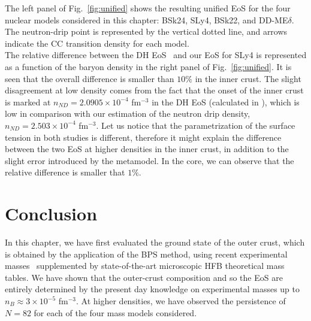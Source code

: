 The left panel of Fig.~\ref{fig:unified} shows the resulting unified EoS for
the four nuclear models considered in this chapter: BSk24, SLy4, BSk22, 
and DD-ME$\delta$. The neutron-drip point is represented by the vertical dotted
line, and arrows indicate the CC transition density for each model.\\
The relative difference between the DH EoS~\cite{Douchin2001} and our EoS for
SLy4 is represented as a function of the baryon density in the right panel of
Fig.~\ref{fig:unified}. It is seen that the overall difference is smaller than 
$10\%$ in the inner crust. The slight disagreement at low density comes from 
the fact that the onset of the inner crust is marked at $n_{ND} = 2.0905 \times
10^{-4}$ fm$^{-3}$ in the DH EoS (calculated in \cite{Haensel1994}), which is 
low in comparison with our estimation of the neutron drip density, $n_{ND} = 
2.503\times 10^{-4}$ fm$^{-3}$. Let us notice that the parametrization of the
surface tension in both studies is different, therefore it might explain the 
difference between the two EoS at higher densities in the inner crust, in 
addition to the slight error introduced by the metamodel. In the core, we can
observe that the relative difference is smaller that $1\%$.


\section{Conclusion}\label{sec:conclu1}

In this chapter, we have first evaluated the ground state of the outer crust, 
which is obtained by the application of the BPS method, using recent 
experimental masses~\cite{Huang2017,Welker2017} supplemented by state-of-the-art 
microscopic HFB theoretical mass tables. We have shown that the outer-crust 
composition and so the EoS are entirely determined by the present day
knowledge on experimental masses up to $n_B \approx 3\times 10^{-5}$ fm$^{-3}$.
At higher densities, we have observed the persistence of $N=82$ for each of the
four mass models considered.

